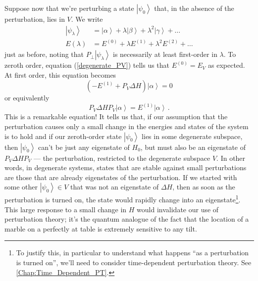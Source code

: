 \documentclass{article}
\theoremstyle{plain}\theoremheaderfont{\normalfont\itshape}\theorembodyfont{\rmfamily}\theoremseparator{.}\newtheorem*{rem}{Remark}\newtheorem*{ex}{Example}\newtheorem*{proof}{Proof}\newtheorem*{altp}{Alternative proof}
\theoremstyle{plain}\theoremheaderfont{\normalfont\bfseries}\theorembodyfont{\rmfamily}\theoremseparator{.}\newtheorem{thm}{Theorem}[section]\newtheorem{lem}[thm]{Lemma}\newtheorem{prop}[thm]{Proposition}\newtheorem*{cor}{Corollary}\newtheorem{defn}[thm]{Definition}\newtheorem{clm}[thm]{Claim}\newtheorem{clminproof}{Claim}
\theoremstyle{break}\theoremheaderfont{\normalfont\itshape}\theorembodyfont{\rmfamily}\theoremseparator{.\medskip}\newtheorem*{proofskip}{Proof}\newtheorem*{exs}{Examples}\newtheorem*{rems}{Remarks}
\theoremstyle{break}\theoremheaderfont{\normalfont\bfseries}\theorembodyfont{\rmfamily}\theoremseparator{.\medskip}\newtheorem{lemskip}[thm]{Lemma}\newtheorem{defnskip}[thm]{Definition}\newtheorem{propskip}[thm]{Proposition}\newtheorem{thmskip}[thm]{Theorem}
\numberwithin{equation}{section}
\newcommand{\ket}[1]{\left| #1 \right\rangle}
\begin{document}
    Suppose now that we're perturbing a state \(\ket{\psi_0}\) that, in the absence of the perturbation, lies in \(V\). We write
    \begin{align}
        \ket{\psi_\lambda}&=\ket{\alpha}+\lambda\ket{\beta}+\lambda^2\ket{\gamma}+\dots\\
        E(\lambda)&=E^{(0)}+\lambda E^{(1)}+\lambda^2 E^{(2)}+\dots
    \end{align}
    just as before, noting that \(P_\perp\ket{\psi_\lambda}\) is necessarily at least first-order in \(\lambda\). To zeroth order, equation (\ref{degenerate_PV}) tells us that \(E^{(0)}=E_V\) as expected. At first order, this equation becomes
    \begin{equation}
        (-E^{(1)}+P_V\Delta H)\ket{\alpha}=0
    \end{equation}
    or equivalently
    \begin{equation}\label{degenerate_first_order_energy}
        P_V\Delta H P_V\ket{\alpha}=E^{(1)}\ket{\alpha}\,.
    \end{equation}
    This is a remarkable equation! It tells us that, if our assumption that the perturbation causes only a small change in the energies and states of the system is to hold and if our zeroth-order state \(\ket{\psi_0}\) lies in some degenerate subspace, then \(\ket{\psi_0}\) can't be just any eigenstate of \(H_0\), but must also be an eigenstate of \(P_V\Delta H P_V\) --- the perturbation, restricted to the degenerate subspace \(V\). In other words, in degenerate systems, states that are stable against small perturbations are those that are already eigenstates of the perturbation. If we started with some other \(\ket{\psi_0}\in V\) that was not an eigenstate of \(\Delta H\), then as soon as the perturbation is turned on, the state would rapidly change into an eigenstate\footnote{To justify this, in particular to understand what happens ``as a perturbation is turned on'', we'll need to consider time-dependent perturbation theory. See \cref{Chap:Time_Dependent_PT}.}. This large response to a small change in \(H\) would invalidate our use of perturbation theory; it's the quantum analogue of the fact that the location of a marble on a perfectly at table is extremely sensitive to any tilt.
\end{document}
